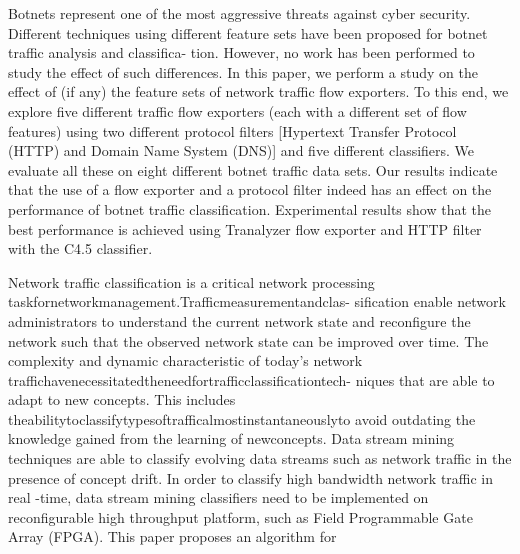 \documentclass[10pt,journal,compsoc]{IEEEtran}
\begin{document}
\cite{Haddadi2016}
Botnets represent one of the most aggressive threats
against cyber security. Different techniques using different feature
sets have been proposed for botnet traffic analysis and classifica-
tion. However, no work has been performed to study the effect of
such differences. In this paper, we perform a study on the effect of
(if any) the feature sets of network traffic flow exporters. To this
end, we explore five different traffic flow exporters (each with a
different set of flow features) using two different protocol filters
[Hypertext Transfer Protocol (HTTP) and Domain Name System
(DNS)] and five different classifiers. We evaluate all these on eight
different botnet traffic data sets. Our results indicate that the use
of a flow exporter and a protocol filter indeed has an effect on the
performance of botnet traffic classification. Experimental results
show that the best performance is achieved using Tranalyzer flow
exporter and HTTP filter with the C4.5 classifier.

\cite{Loo2016}

Network traffic classification is a critical network processing
taskfornetworkmanagement.Trafficmeasurementandclas-
sification enable network administrators to understand the
current network state and reconfigure the network such that
the observed network state can be improved over time. The
complexity and dynamic characteristic of today’s network
traffichavenecessitatedtheneedfortrafficclassificationtech-
niques that are able to adapt to new concepts. This includes
theabilitytoclassifytypesoftrafficalmostinstantaneouslyto
avoid outdating the knowledge gained from the learning of
newconcepts.
Data stream mining techniques are able to classify evolving data streams such as network traffic in the presence of concept
drift. In order to classify high bandwidth network traffic in real
-time, data stream mining classifiers need to be implemented on
reconfigurable high throughput platform, such as Field Programmable Gate Array (FPGA). This paper proposes an algorithm for
%
%
\end{document}
